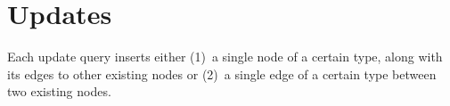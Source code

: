 


\section{Updates}
\label{sec:inserts}

Each update query inserts either (1)~a single node of a certain type, along with its edges to other existing nodes or (2)~a single edge of a certain type between two existing nodes.



%
%
%
